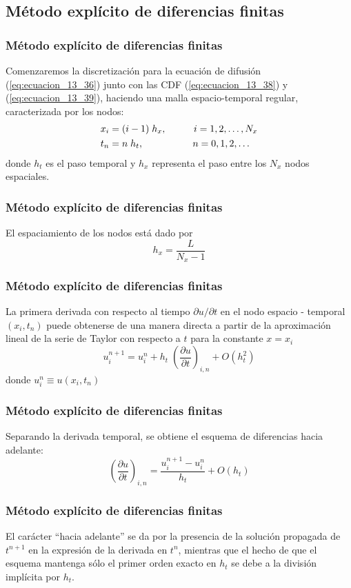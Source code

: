 \subsection{Método explícito de diferencias finitas}
\begin{frame}
\frametitle{Método explícito de diferencias finitas}
Comenzaremos la discretización para la ecuación de difusión (\ref{eq:ecuacion_13_36}) junto con las CDF (\ref{eq:ecuacion_13_38}) y (\ref{eq:ecuacion_13_39}), haciendo una malla espacio-temporal regular, caracterizada por los nodos:
\begin{align}
x_{i} &= (i - 1) \; h_{x}, \hspace{1cm} i = 1, 2, \ldots, N_{x} \label{eq:ecuacion_13_40} \\
t_{n} &= n \; h_{t}, \hspace{1.8cm} n = 0, 1, 2, \ldots \label{eq:ecuacion_13_41}
\end{align}
donde $h_{t}$ es el paso temporal y $h_{x}$ representa el paso entre los $N_{x}$ nodos espaciales.
\end{frame}
\begin{frame}
\frametitle{Método explícito de diferencias finitas}
El espaciamiento de los nodos está dado por
\begin{equation}
h_{x} = \dfrac{L}{N_{x} - 1}
\label{eq:ecuacion_13_42}
\end{equation}
\end{frame}
\begin{frame}
\frametitle{Método explícito de diferencias finitas}
La primera derivada con respecto al tiempo $\partial u / \partial t$ en el nodo espacio - temporal $(x_{i}, t_{n})$ puede obtenerse de una manera directa a partir de la aproximación lineal de la serie de Taylor con respecto a $t$ para la constante $x = x_{i}$
\[ u_{i}^{n + 1} = u_{i}^{n} + h_{t} \; \left( \dfrac{\partial u}{\partial t} \right)_{i,n} + O(h_{t}^{2}) \]
donde $u_{i}^{n} \equiv u(x_{i}, t_{n})$
\end{frame}
\begin{frame}
\frametitle{Método explícito de diferencias finitas}
Separando la derivada temporal, se obtiene el esquema de diferencias hacia adelante:
\begin{equation}
\left( \dfrac{\partial u}{\partial t} \right)_{i,n} = \dfrac{u_{i}^{n + 1} -u_{i}^{n}}{h_{t}} + O(h_{t})
\label{eq:ecuacion_13_43}
\end{equation}
\end{frame}
\begin{frame}
\frametitle{Método explícito de diferencias finitas}
El carácter \enquote{hacia adelante} se da por la presencia de la solución propagada de $t^{n + 1}$ en la expresión de la derivada en $t^{n}$, mientras que el hecho de que el esquema mantenga sólo el primer orden exacto en $h_{t}$ se debe a la división implícita por $h_{t}$.
\end{frame}
